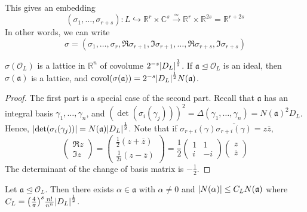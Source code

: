 This gives an embedding
\[ (\sigma_1, \dots, \sigma_{r+s}) \colon L \hookrightarrow \mathbb R^r \times \mathbb C^s \xrightarrow{\simeq} \mathbb R^r \times \mathbb R^{2s} = \mathbb R^{r+2s} \]
In other words, we can write
\[ \sigma = (\sigma_1, \dots, \sigma_r, \Re \sigma_{r+1}, \Im \sigma_{r+1}, \dots, \Re\sigma_{r+s}, \Im\sigma_{r+s}) \]
\begin{lemma}
    \( \sigma(\mathcal O_L) \) is a lattice in \( \mathbb R^n \) of covolume \( 2^{-s} \abs{D_L}^{\frac{1}{2}} \).
    If \( \mathfrak a \trianglelefteq \mathcal O_L \) is an ideal, then \( \sigma(\mathfrak a) \) is a lattice, and \( \operatorname{covol}(\sigma(\mathfrak a)) = 2^{-s} \abs{D_L}^{\frac{1}{2}} N(\mathfrak a) \).
\end{lemma}
\begin{proof}
    The first part is a special case of the second part.
    Recall that \( \mathfrak a \) has an integral basis \( \gamma_1, \dots, \gamma_n \), and \( (\det (\sigma_i(\gamma_j)))^2 = \Delta(\gamma_1, \dots, \gamma_n) = N(\mathfrak a)^2 D_L \).
    Hence, \( \abs{\det(\sigma_i(\gamma_j))} = N(\mathfrak a) \abs{D_L}^{\frac{1}{2}} \).
    Note that if \( \sigma_{r+i}(\gamma) \overline{\sigma_{r+i}(\gamma)} = z\overline z \),
    \[ \begin{pmatrix}
        \Re z \\
        \Im z
    \end{pmatrix} = \begin{pmatrix}
        \frac{1}{2}(z + \overline z) \\
        \frac{1}{2i}(z - \overline z)
    \end{pmatrix} = \frac{1}{2}\begin{pmatrix}
        1 & 1 \\
        i & -i
    \end{pmatrix} \begin{pmatrix}
        z \\ \overline z
    \end{pmatrix} \]
    The determinant of the change of basis matrix is \( -\frac{1}{2} \).
\end{proof}
\begin{proposition}
    Let \( \mathfrak a \trianglelefteq \mathcal O_L \).
    Then there exists \( \alpha \in \mathfrak a \) with \( \alpha \neq 0 \) and \( \abs{N(\alpha)} \leq C_L N(\mathfrak a) \) where \( C_L = \qty(\frac{4}{\pi})^s \frac{n!}{n^n} \abs{D_L}^{\frac{1}{2}} \).
\end{proposition}
